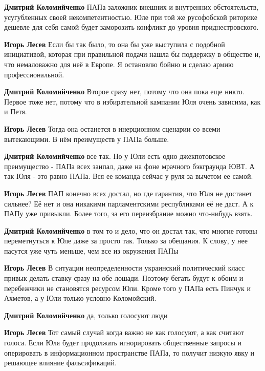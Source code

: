 \begin{itemize}
\begin{itemize}
\textbf{Дмитрий Коломийченко} ПАПа заложник внешних и внутренних обстоятельств, усугубленных своей некомпетентностью. Юле при той же русофобской риторике дешевле для себя самой будет заморозить конфликт до уровня приднестровского.

\textbf{Игорь Лесев} Если бы так было, то она бы уже выступила с подобной инициативой, которая при правильной подачи нашла бы поддержку в обществе и, что немаловажно для неё в Европе. Я остановлю бойню и сделаю армию профессиональной.

\textbf{Дмитрий Коломийченко} Второе сразу нет, потому что она пока еще никто. Первое тоже нет, потому что в избирательной кампании Юля очень зависима, как и Петя.

\textbf{Игорь Лесев} Тогда она останется в инерционном сценарии со всеми вытекающими. В нём преимуществ у ПАПа больше.

\textbf{Дмитрий Коломийченко} все так. Но у Юли есть одно джекпотовское преимущество - ПАПа всех заипал, даже на фоне мрачного бэкграунда ЮВТ. А так Юля - это равно ПАПа. Вся ее команда сейчас у руля за вычетом ее самой.

\textbf{Игорь Лесев} ПАП конечно всех достал, но где гарантия, что Юля не достанет сильнее? Её нет и она никакими парламентскими республиками её не даст. А к ПАПу уже привыкли. Более того, за его переизбрание можно что-нибудь взять.

\textbf{Дмитрий Коломийченко} в том то и дело, что он достал так, что многие готовы переметнуться к Юле даже за просто так. Только за обещания. К слову, у нее пасутся уже чуть меньше, чем все из окружения ПАПы

\textbf{Игорь Лесев} В ситуации неопределенности украинский политический класс привык делать ставку сразу на обе лошади. Поэтому бегать будут к обоим и перебежчики не становятся ресурсом Юли. Кроме того у ПАПа есть Пинчук и Ахметов, а у Юли только условно Коломойский.

\textbf{Дмитрий Коломийченко} да, только голосуют люди

\textbf{Игорь Лесев} Тот самый случай когда важно не как голосуют, а как считают голоса. Если Юля будет продолжать игнорировать общественные запросы и оперировать в информационном пространстве ПАПа, то получит низкую явку и решающее влияние фальсификаций.
\end{itemize} %


\end{itemize}
